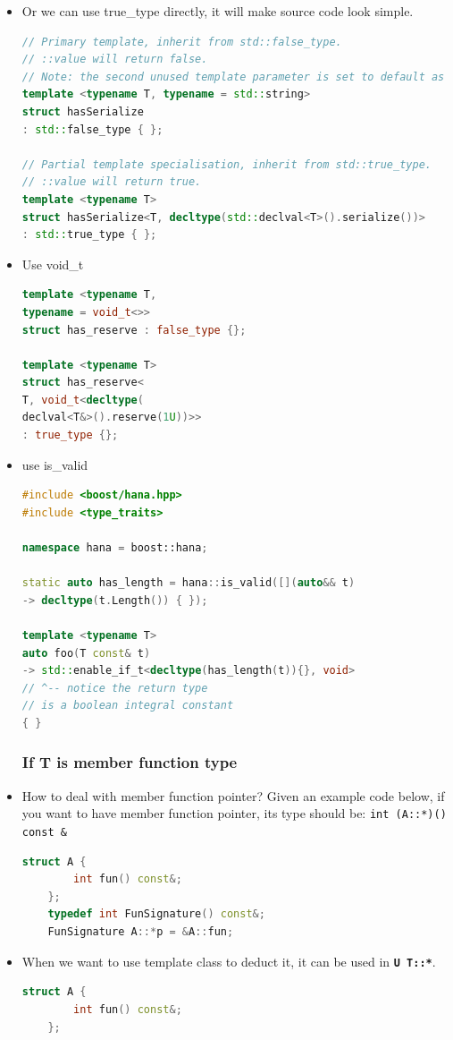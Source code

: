 \documentclass[a4paper,11pt,twoside]{book}
\begin{document}
\begin{itemize}
	\item Or we can use true\_type directly, it will make source code look simple.

\begin{lstlisting}[frame=single, language=c++]
// Primary template, inherit from std::false_type.
// ::value will return false. 
// Note: the second unused template parameter is set to default as std::string!!!
template <typename T, typename = std::string>
struct hasSerialize
: std::false_type { };

// Partial template specialisation, inherit from std::true_type.
// ::value will return true. 
template <typename T>
struct hasSerialize<T, decltype(std::declval<T>().serialize())>
: std::true_type { };
\end{lstlisting}

	\item Use void\_t
\begin{lstlisting}[frame=single, language=c++]
template <typename T,
typename = void_t<>>
struct has_reserve : false_type {};

template <typename T>
struct has_reserve<
T, void_t<decltype(
declval<T&>().reserve(1U))>>
: true_type {};
\end{lstlisting}
		
	\item use is\_valid
\begin{lstlisting}[frame=single, language=c++]
#include <boost/hana.hpp>
#include <type_traits>

namespace hana = boost::hana;

static auto has_length = hana::is_valid([](auto&& t)
-> decltype(t.Length()) { });

template <typename T>
auto foo(T const& t)
-> std::enable_if_t<decltype(has_length(t)){}, void>
// ^-- notice the return type 
// is a boolean integral constant
{ }
\end{lstlisting}

	
	
\subsubsection{If T is member function type}
	\item How to deal with member function pointer? Given an example code below, if you want to have member function pointer, its type should be: \texttt{int (A::*)() const \&} 
\begin{lstlisting}[frame=single, language=c++]
	struct A {
		int fun() const&;
	};
	typedef int FunSignature() const&;
	FunSignature A::*p = &A::fun;
\end{lstlisting}
\item When we want to use template class to deduct it, it can be used in \textbf{\texttt{U T::*}}.
\begin{lstlisting}[frame=single, language=c++]
	struct A {
		int fun() const&;
	};
	

\end{lstlisting}
\end{itemize}
\end{document}
